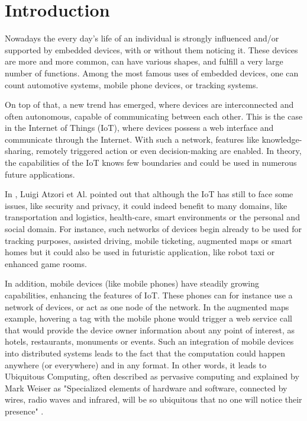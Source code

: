 \chapter{Introduction}
\label{cha:introduction}

Nowadays the every day's life of an individual is strongly influenced and/or supported by embedded devices, with or without them noticing it. These devices are more and more common, can have various shapes, and fulfill a very large number of functions. Among the most famous uses of embedded devices,  one can count automotive systems, mobile phone devices, or tracking systems.

On top of that, a new trend has emerged, where devices are interconnected and often autonomous, capable of communicating between each other. This is the case in the Internet of Things (IoT), where devices possess a web interface and communicate through the Internet. With such a network, features like knowledge-sharing, remotely triggered action or even decision-making are enabled. In theory, the capabilities of the IoT knows few boundaries and could be used in numerous future applications. 

In  \cite{Atzori2010}, Luigi Atzori et Al. pointed out that although the IoT has still to face some issues, like security and privacy, it could indeed benefit to many domains, like transportation and logistics, health-care, smart environments or the personal and social domain. For instance, such networks of devices begin already to be used for tracking purposes, assisted driving, mobile ticketing, augmented maps or smart homes but it could also be used in futuristic application, like robot taxi or enhanced game rooms. 

In addition, mobile devices (like mobile phones) have steadily growing capabilities, enhancing the features of IoT. These phones can for instance use a network of devices, or act as one node of the network. In the augmented maps example, hovering a tag with the mobile phone would trigger a web service call that would provide the device owner information about any point of interest, as hotels, restaurants, monuments or events. Such an integration of mobile devices into distributed systems leads to the fact that the computation could happen anywhere (or everywhere) and in any format. In other words, it leads to Ubiquitous Computing, often described as pervasive computing and explained by Mark Weiser as "Specialized elements of hardware and software, connected by wires, radio waves and infrared, will be so ubiquitous that no one will notice their presence" \cite{Computer_21Century}.

